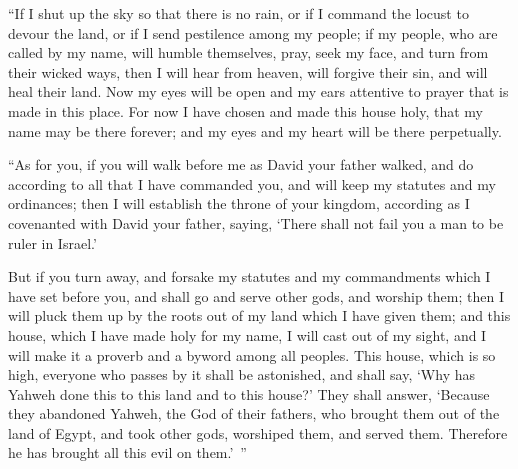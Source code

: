 {\par }{\PP {}“If I shut up the sky so that there is no rain, or if I command the locust to devour the land, or if I send pestilence among my people;
if my people, who are called by my name, will humble themselves, pray, seek my face, and turn from their wicked ways, then I will hear from heaven, will forgive their sin, and will heal their land.
Now my eyes will be open and my ears attentive to prayer that is made in this place.
For now I have chosen and made this house holy, that my name may be there forever; and my eyes and my heart will be there perpetually.
\par }{\PP {}“As for you, if you will walk before me as David your father walked, and do according to all that I have commanded you, and will keep my statutes and my ordinances;
then I will establish the throne of your kingdom, according as I covenanted with David your father, saying, ‘There shall not fail you a man to be ruler in Israel.’
\par }{\PP {}But if you turn away, and forsake my statutes and my commandments which I have set before you, and shall go and serve other gods, and worship them;
then I will pluck them up by the roots out of my land which I have given them; and this house, which I have made holy for my name, I will cast out of my sight, and I will make it a proverb and a byword among all peoples.
This house, which is so high, everyone who passes by it shall be astonished, and shall say, ‘Why has Yahweh done this to this land and to this house?’
They shall answer, ‘Because they abandoned Yahweh, the God of their fathers, who brought them out of the land of Egypt, and took other gods, worshiped them, and served them. Therefore he has brought all this evil on them.’ ”

}

